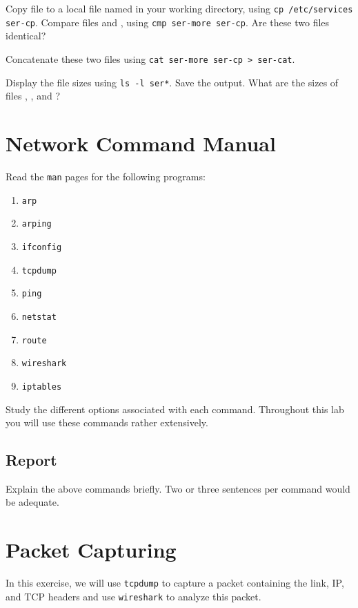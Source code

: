 \documentclass{../UTNetLab}
\begin{document}
    Copy  file to a local file named  in your working directory,
    using \lstinline{cp /etc/services ser-cp}. Compare files  and , using \lstinline{cmp ser-more ser-cp}. Are these two files identical?

    Concatenate these two files using \lstinline{cat ser-more ser-cp > ser-cat}.

    Display the file sizes using \lstinline{ls -l ser*}. Save the output. What are the sizes of files , , and ?

\section{Network Command Manual}
    Read the \lstinline{man} pages for the following programs:
    \begin{multicols}{3}
        \begin{enumerate}
            \item \lstinline{arp}
            \item \lstinline{arping}
            \item \lstinline{ifconfig}
            \item \lstinline{tcpdump}
            \item \lstinline{ping}
            \item \lstinline{netstat}
            \item \lstinline{route}
            \item \lstinline{wireshark}
            \item \lstinline{iptables}
        \end{enumerate}
    \end{multicols}
    Study the different options associated with each command.
    Throughout this lab you will use these commands rather extensively.
    
    \subsection*{Report}
    Explain the above commands briefly.
    Two or three sentences per command would be adequate.

\section{Packet Capturing}
    In this exercise, we will use \lstinline{tcpdump} to capture a packet containing the link, IP, and TCP headers and use \lstinline{wireshark} to analyze this packet.
\end{document}
